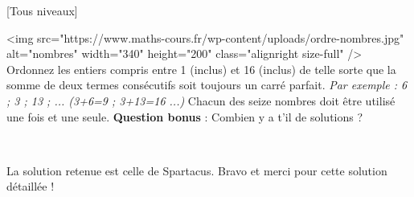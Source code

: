 
%
[Tous niveaux]

\begin{center}
\end{center}
<img src="https://www.maths-cours.fr/wp-content/uploads/ordre-nombres.jpg" alt="nombres" width="340" height="200" class="alignright size-full" />
Ordonnez les entiers compris entre 1 (inclus) et 16 (inclus) de telle sorte que la somme de deux termes consécutifs soit toujours un carré parfait.
\textit{Par exemple : 6 ; 3 ; 13 ; ... (3+6=9 ; 3+13=16 ...)}
Chacun des seize nombres doit être utilisé une fois et une seule.
\textbf{Question bonus} : Combien y a t'il de solutions ?
\par
~
\begin{solution}
     La solution retenue est celle de Spartacus. Bravo et merci pour cette solution détaillée !
     \par
     [pdf-embedder url="/wp-content/uploads/slides/enigme-10-16/solution.pdf" width="676"]
\end{solution}
